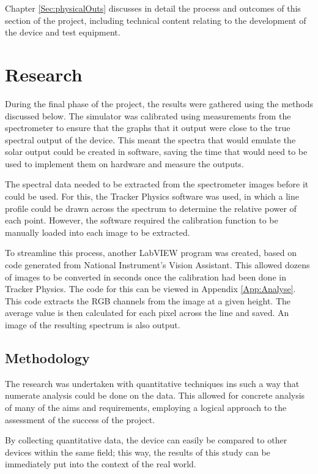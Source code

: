 Chapter \ref{Sec:physicalOuts} discusses in detail the process and outcomes of this section of the project, including technical content relating to the development of the device and test equipment.

\section{Research}

During the final phase of the project, the results were gathered using the methods discussed below. The simulator was calibrated using measurements from the spectrometer to ensure that the graphs that it output were close to the true spectral output of the device. This meant the spectra that would emulate the solar output could be created in software, saving the time that would need to be used to implement them on hardware and measure the outputs.

The spectral data needed to be extracted from the spectrometer images before it could be used. For this, the Tracker Physics software was used, in which a line profile could be drawn across the spectrum to determine the relative power of each point. However, the software required the calibration function to be manually loaded into each image to be extracted. 

To streamline this process, another LabVIEW program was created, based on code generated from National Instrument's Vision Assistant. This allowed dozens of images to be converted in seconds once the calibration had been done in Tracker Physics. The code for this can be viewed in Appendix \ref{App:Analyse}. This code extracts the RGB channels from the image at a given height. The average value is then calculated for each pixel across the line and saved. An image of the resulting spectrum is also output.

\subsection{Methodology}

The research was undertaken with quantitative techniques ins such a way that numerate analysis could be done on the data. This allowed for concrete analysis of many of the aims and requirements, employing a logical approach to the assessment of the success of the project.

By collecting quantitative data, the device can easily be compared to other devices within the same field; this way, the results of this study can be immediately put into the context of the real world.

